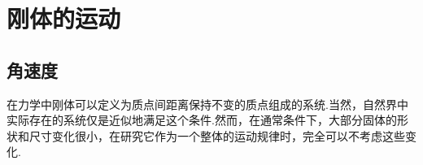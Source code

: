 \chapter{刚体的运动}

\section{角速度}

在力学中刚体可以定义为质点间距离保持不变的质点组成的系统.当然，自然界中实际存在的系统仅是近似地满足这个条件.然而，在通常条件下，大部分固体的形状和尺寸变化很小，在研究它作为一个整体的运动规律时，完全可以不考虑这些变化.


